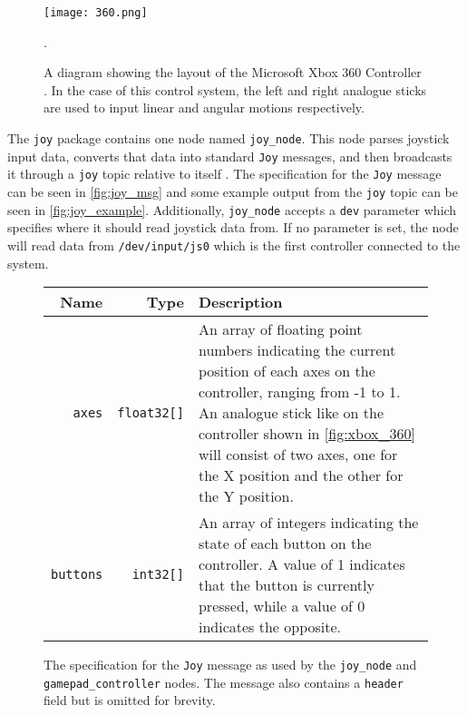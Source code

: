 \begin{figure}[!h]
	\centering
	\texttt{[image: 360.png]}
	\caption{A diagram showing the layout of the Microsoft Xbox 360 Controller \cite{360_controller}. In the case of this control system, the left and right analogue sticks are used to input linear and angular motions respectively.}.
	\label{fig:xbox_360}
\end{figure}

The \texttt{joy} package contains one node named \texttt{joy\_node}. This node parses joystick input data, converts that data into standard \texttt{Joy} messages, and then broadcasts it through a \texttt{joy} topic relative to itself \cite{ros_wiki_joy}. The specification for the \texttt{Joy} message can be seen in \autoref{fig:joy_msg} and some example output from the \texttt{joy} topic can be seen in \autoref{fig:joy_example}. Additionally, \texttt{joy\_node} accepts a \texttt{dev} parameter which specifies where it should read joystick data from. If no parameter is set, the node will read data from \texttt{/dev/input/js0} which is the first controller connected to the system. 

\begin{figure}[!h]
	\centering
	\begin{tabular}{ r r p{10cm} }
		\textbf{Name} & \textbf{Type} & \textbf{Description} \\
		\hline

		\texttt{axes} & 
		\texttt{float32[]} &
		An array of floating point numbers indicating the current position of each axes on the controller, ranging from -1 to 1. An analogue stick like on the controller shown in \autoref{fig:xbox_360} will consist of two axes, one for the X position and the other for the Y position. \\
		
		\texttt{buttons} & 
		\texttt{int32[]} & 
		An array of integers indicating the state of each button on the controller. A value of 1 indicates that the button is currently pressed, while a value of 0 indicates the opposite. \\
	\end{tabular}
	\caption{The specification for the \texttt{Joy} message as used by the \texttt{joy\_node} and \texttt{gamepad\_controller} nodes. The message also contains a \texttt{header} field but is omitted for brevity.}
	\label{fig:joy_msg}
\end{figure}

